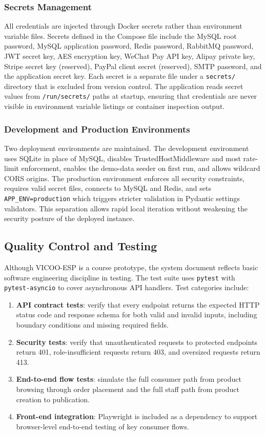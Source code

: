 \documentclass[11pt]{article}
\newcommand{\projectname}{VICOO-ESP}
\begin{document}
\subsubsection{Secrets Management}
All credentials are injected through Docker secrets rather than environment variable files. Secrets defined in the Compose file include the MySQL root password, MySQL application password, Redis password, RabbitMQ password, JWT secret key, AES encryption key, WeChat Pay API key, Alipay private key, Stripe secret key (reserved), PayPal client secret (reserved), SMTP password, and the application secret key. Each secret is a separate file under a \texttt{secrets/} directory that is excluded from version control. The application reads secret values from \texttt{/run/secrets/} paths at startup, ensuring that credentials are never visible in environment variable listings or container inspection output.

\subsubsection{Development and Production Environments}
Two deployment environments are maintained. The development environment uses SQLite in place of MySQL, disables TrustedHostMiddleware and most rate-limit enforcement, enables the demo-data seeder on first run, and allows wildcard CORS origins. The production environment enforces all security constraints, requires valid secret files, connects to MySQL and Redis, and sets \texttt{APP\_ENV=production} which triggers stricter validation in Pydantic settings validators. This separation allows rapid local iteration without weakening the security posture of the deployed instance.

\subsection{Quality Control and Testing}
Although \projectname{} is a course prototype, the system document reflects basic software engineering discipline in testing. The test suite uses \texttt{pytest} with \texttt{pytest-asyncio} to cover asynchronous API handlers. Test categories include:

\begin{enumerate}[leftmargin=2.2em]
    \item \textbf{API contract tests}: verify that every endpoint returns the expected HTTP status code and response schema for both valid and invalid inputs, including boundary conditions and missing required fields.
    \item \textbf{Security tests}: verify that unauthenticated requests to protected endpoints return 401, role-insufficient requests return 403, and oversized requests return 413.
    \item \textbf{End-to-end flow tests}: simulate the full consumer path from product browsing through order placement and the full staff path from product creation to publication.
    \item \textbf{Front-end integration}: Playwright is included as a dependency to support browser-level end-to-end testing of key consumer flows.
\end{enumerate}
\end{document}
